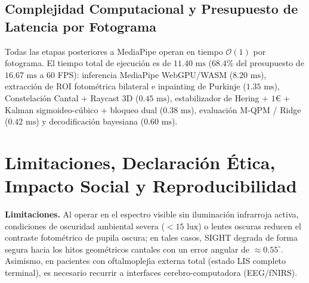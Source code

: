 \documentclass[twocolumn,10pt]{article}
\begin{document}
\begin{table}[h]
\centering
\caption{Estudio de Ablaci\'on por Componentes del Pipeline SIGHT ($1920 \times 1080\text{ px}$).}
\label{tab:ablation}
\end{table}

\subsection{Complejidad Computacional y Presupuesto de Latencia por Fotograma}
Todas las etapas posteriores a MediaPipe operan en tiempo $\mathcal{O}(1)$ por fotograma. El tiempo total de ejecuci\'on es de $11.40\text{ ms}$ ($68.4\%$ del presupuesto de $16.67\text{ ms}$ a 60 FPS): inferencia MediaPipe WebGPU/WASM ($8.20\text{ ms}$), extracci\'on de ROI fotom\'etrica bilateral e inpainting de Purkinje ($1.35\text{ ms}$), Constelaci\'on Cantal + Raycast 3D ($0.45\text{ ms}$), estabilizador de Hering + $1\text{€}$ + Kalman sigmoideo-c\'ubico + bloqueo dual ($0.38\text{ ms}$), evaluaci\'on M-QPM / Ridge ($0.42\text{ ms}$) y decodificaci\'on bayesiana ($0.60\text{ ms}$).

\section{Limitaciones, Declaraci\'on \'Etica, Impacto Social y Reproducibilidad}
\label{sec:limitations}
\textbf{Limitaciones.} Al operar en el espectro visible sin iluminaci\'on infrarroja activa, condiciones de oscuridad ambiental severa ($<15\text{ lux}$) o lentes oscuras reducen el contraste fotom\'etrico de pupila oscura; en tales casos, SIGHT degrada de forma segura hacia los hitos geom\'etricos cantales con un error angular de $\approx 0.55^\circ$. Asimismo, en pacientes con oftalmoplej\'{\i}a externa total (estado LIS completo terminal), es necesario recurrir a interfaces cerebro-computadora (EEG/fNIRS).
\end{document}
